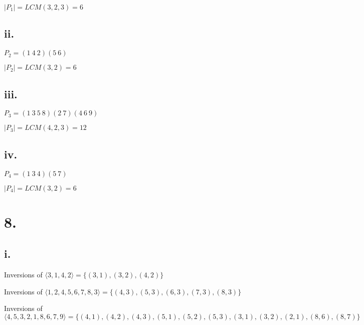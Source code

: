 \documentclass{article}
\begin{document}
\noindent
$|P_1| = LCM(3, 2, 3) = 6$

\subsection*{ii.}
$P_2 = (1 \ 4 \ 2) (5 \ 6)$

\noindent
$|P_2| = LCM(3, 2) = 6$

\subsection*{iii.}
$P_3 = (1 \ 3 \ 5 \ 8) (2 \ 7) (4 \ 6 \ 9)$

\noindent
$|P_3| = LCM(4, 2, 3) = 12$

\subsection*{iv.}
$P_4 = (1 \ 3 \ 4) (5 \ 7)$

\noindent
$|P_4| = LCM(3, 2) = 6$

\section*{8.}
\subsection*{i.}
Inversions of $\langle 3, 1, 4, 2 \rangle = \{(3, 1), (3, 2), (4, 2) \}$
\newline

\noindent
Inversions of $\langle 1, 2, 4, 5, 6, 7, 8, 3 \rangle = \{(4, 3), (5, 3), (6, 3), (7, 3), (8, 3) \}$
\newline

\noindent
Inversions of $\langle 4, 5, 3, 2, 1, 8, 6, 7, 9 \rangle = \{(4, 1), (4, 2), (4, 3), (5, 1), (5, 2), (5, 3), (3, 1), (3, 2), (2, 1), (8, 6), (8, 7) \}$
\end{document}
